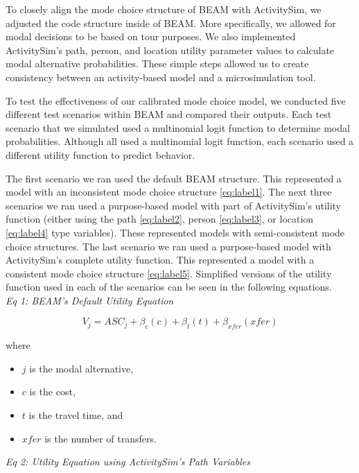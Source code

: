 \documentclass[]{elsarticle} %
\providecommand{\tightlist}{%
  \setlength{\itemsep}{0pt}\setlength{\parskip}{0pt}}
\begin{document}
To closely align the mode choice structure of BEAM with ActivitySim, we adjusted the code structure inside of BEAM. More specifically, we allowed for modal decisions to be based on tour purposes. We also implemented ActivitySim's path, person, and location utility parameter values to calculate modal alternative probabilities. These simple steps allowed us to create consistency between an activity-based model and a microsimulation tool.

To test the effectiveness of our calibrated mode choice model, we conducted five different test scenarios within BEAM and compared their outputs. Each test scenario that we simulated used a multinomial logit function to determine modal probabilities. Although all used a multinomial logit function, each scenario used a different utility function to predict behavior.

The first scenario we ran used the default BEAM structure. This represented a model with an inconsistent mode choice structure \eqref{eq:label1}. The next three scenarios we ran used a purpose-based model with part of ActivitySim's utility function (either using the path \eqref{eq:label2}, person \eqref{eq:label3}, or location \eqref{eq:label4} type variables). These represented models with semi-consistent mode choice structures. The last scenario we ran used a purpose-based model with ActivitySim's complete utility function. This represented a model with a consistent mode choice structure \eqref{eq:label5}. Simplified versions of the utility function used in each of the scenarios can be seen in the following equations.\\

\emph{Eq 1: BEAM's Default Utility Equation}

\begin{equation}
  V_j = ASC_j + \beta_{c}(c) + \beta_{t}(t) + \beta_{xfer}(xfer) \label{eq:label1}
\end{equation}

where

\begin{itemize}
\tightlist
\item
  \(j\) is the modal alternative,
\item
  \(c\) is the cost,
\item
  \(t\) is the travel time, and
\item
  \(xfer\) is the number of transfers.
\end{itemize}

\emph{Eq 2: Utility Equation using ActivitySim's Path Variables}
\end{document}
